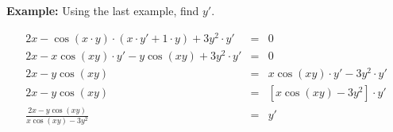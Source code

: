 \documentclass[12pt,addpoints, answers, fleqn]{exam}
\begin{document}
\textbf{Example:} Using the last example, find $y'$.

\begin{solution}
\begin{eqnarray*}
2x - \cos \left( x \cdot y \right) \cdot \left( x \cdot y' + 1 \cdot y \right) + 3y^2 \cdot y' &=& 0\\
2x - x \cos \left( x  y \right) \cdot y'  - y \cos \left( x y \right) + 3y^2 \cdot y' &=& 0\\
2x   - y \cos \left( x  y \right)  &=&  x \cos \left( x  y \right) \cdot y'  - 3y^2 \cdot y'\\
2x   - y \cos \left( x  y \right)  &=&  \left[ x \cos \left( x  y \right)   - 3y^2\right] \cdot y'\\
\frac{2x   - y \cos \left( x  y \right) }{ x \cos \left( x  y \right)   - 3y^2} &=&  y'\\
\end{eqnarray*}

\end{solution}
\end{document}
